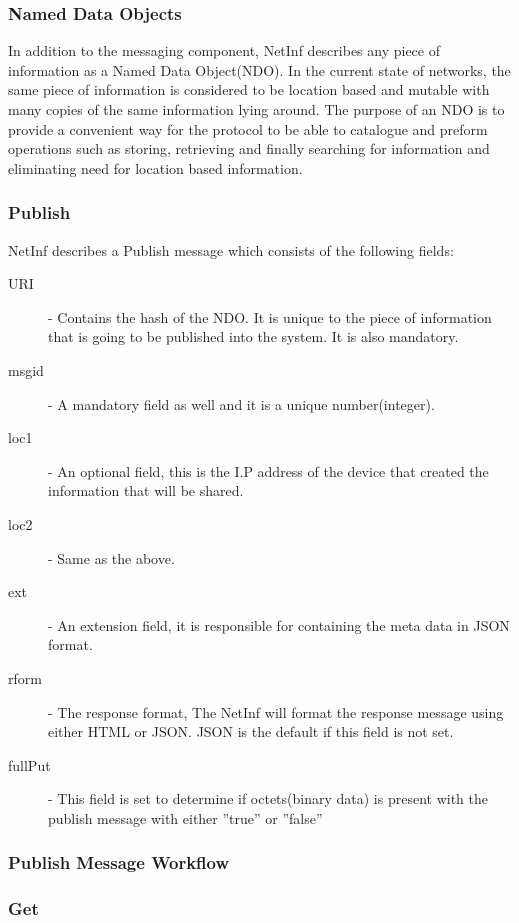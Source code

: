 \subsubsection{Named Data Objects}
In addition to the messaging component, NetInf describes any piece of information as a Named Data Object(NDO). In the current state of networks, the same piece of information is considered to be location based and mutable with many copies of the same information lying around. The purpose of an NDO is to provide a convenient way for the protocol to be able to catalogue and preform operations such as storing, retrieving and finally searching for information and eliminating need for location based information.


\subsubsection{Publish}

NetInf describes a Publish message which consists of the following fields:

\begin{description}
\item[URI]  - Contains the hash of the NDO. It is unique to the piece of information that is going to be published into the system. It is also mandatory.
\item[msgid] - A mandatory field as well and it is a unique number(integer). 
\item[loc1] - An optional field, this is the I.P address of the device that created the information that will be shared.
\item[loc2] - Same as the above.
\item[ext] - An extension field, it is responsible for containing the meta data in JSON format.
\item[rform] - The response format, The NetInf will format the response message using either HTML or JSON. JSON is the default if this field is not set.
\item[fullPut] - This field is set to determine if octets(binary data) is present with the publish message with either ''true'' or ''false''
\end{description}

\subsubsection{Publish Message Workflow}


\subsubsection{Get}

